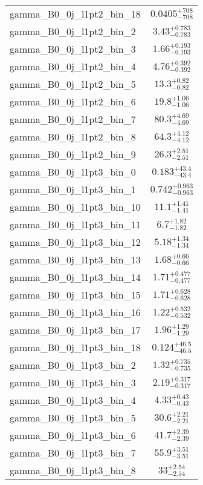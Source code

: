 \begin{tabular}{|l|c|}
gamma\_B0\_0j\_l1pt2\_bin\_18 & $0.0405^{+708}_{-708}$ \\
gamma\_B0\_0j\_l1pt2\_bin\_2 & $3.43^{+0.783}_{-0.783}$ \\
gamma\_B0\_0j\_l1pt2\_bin\_3 & $1.66^{+0.193}_{-0.193}$ \\
gamma\_B0\_0j\_l1pt2\_bin\_4 & $4.76^{+0.392}_{-0.392}$ \\
gamma\_B0\_0j\_l1pt2\_bin\_5 & $13.3^{+0.82}_{-0.82}$ \\
gamma\_B0\_0j\_l1pt2\_bin\_6 & $19.8^{+1.06}_{-1.06}$ \\
gamma\_B0\_0j\_l1pt2\_bin\_7 & $80.3^{+4.69}_{-4.69}$ \\
gamma\_B0\_0j\_l1pt2\_bin\_8 & $64.3^{+4.12}_{-4.12}$ \\
gamma\_B0\_0j\_l1pt2\_bin\_9 & $26.3^{+2.51}_{-2.51}$ \\
gamma\_B0\_0j\_l1pt3\_bin\_0 & $0.183^{+43.4}_{-43.4}$ \\
gamma\_B0\_0j\_l1pt3\_bin\_1 & $0.742^{+0.963}_{-0.963}$ \\
gamma\_B0\_0j\_l1pt3\_bin\_10 & $11.1^{+1.41}_{-1.41}$ \\
gamma\_B0\_0j\_l1pt3\_bin\_11 & $6.7^{+1.82}_{-1.82}$ \\
gamma\_B0\_0j\_l1pt3\_bin\_12 & $5.18^{+1.34}_{-1.34}$ \\
gamma\_B0\_0j\_l1pt3\_bin\_13 & $1.68^{+0.66}_{-0.66}$ \\
gamma\_B0\_0j\_l1pt3\_bin\_14 & $1.71^{+0.477}_{-0.477}$ \\
gamma\_B0\_0j\_l1pt3\_bin\_15 & $1.71^{+0.628}_{-0.628}$ \\
gamma\_B0\_0j\_l1pt3\_bin\_16 & $1.22^{+0.532}_{-0.532}$ \\
gamma\_B0\_0j\_l1pt3\_bin\_17 & $1.96^{+1.29}_{-1.29}$ \\
gamma\_B0\_0j\_l1pt3\_bin\_18 & $0.124^{+46.5}_{-46.5}$ \\
gamma\_B0\_0j\_l1pt3\_bin\_2 & $1.32^{+0.735}_{-0.735}$ \\
gamma\_B0\_0j\_l1pt3\_bin\_3 & $2.19^{+0.317}_{-0.317}$ \\
gamma\_B0\_0j\_l1pt3\_bin\_4 & $4.33^{+0.43}_{-0.43}$ \\
gamma\_B0\_0j\_l1pt3\_bin\_5 & $30.6^{+2.21}_{-2.21}$ \\
gamma\_B0\_0j\_l1pt3\_bin\_6 & $41.7^{+2.39}_{-2.39}$ \\
gamma\_B0\_0j\_l1pt3\_bin\_7 & $55.9^{+3.51}_{-3.51}$ \\
gamma\_B0\_0j\_l1pt3\_bin\_8 & $33^{+2.54}_{-2.54}$ \\

\end{tabular}
